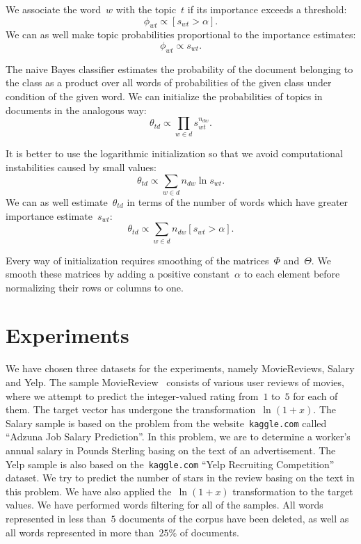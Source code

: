 \documentclass{sig-alternate-2013}
\begin{document}
We associate the word~$w$ with the topic~$t$ if its importance
exceeds a threshold:
\[
    \phi_{wt} \propto [s_{wt} > \alpha].
\]
We can as well make topic probabilities proportional to the importance estimates:
\[
    \phi_{wt} \propto s_{wt}.
\]


The naive Bayes classifier estimates the probability of the document belonging to the class as a product over all words of probabilities of the given class under condition of the given word. We can initialize the probabilities of topics in documents in the analogous way:
\[
    \theta_{td}
    \propto
    \prod_{w \in d}
        s_{wt}^{n_{dw}}.
\]

It is better to use the logarithmic initialization so that we avoid computational instabilities caused by small values:
\begin{equation}
\label{eq:theta_init_prob_log}
    \theta_{td}
    \propto
    \sum_{w \in d}
        n_{dw} \ln s_{wt}.
\end{equation}
We can as well estimate~$\theta_{td}$ in terms of the number of words which
have greater importance estimate~$s_{wt}$:
\begin{equation}
\label{eq:theta_init_threshold}
    \theta_{td} \propto \sum_{w \in d} n_{dw} [s_{wt} > \alpha].
\end{equation}


Every way of initialization requires smoothing of the matrices~$\Phi$ and~$\Theta$.
We smooth these matrices by adding a positive constant~$\alpha$ to each element
before normalizing their rows or columns to one.


\section{Experiments}

We have chosen three datasets for the experiments, namely MovieReviews, Salary and Yelp. The sample MovieReview~\cite{pang05reviews} consists of various user reviews of movies, where we attempt to predict the integer-valued rating from~$1$ to~$5$ for each of them.
The target vector has undergone the transformation~$\ln(1 + x)$. The Salary sample is based on the problem from the website~\texttt{kaggle.com} called ``Adzuna Job Salary Prediction''.
In this problem, we are to determine a worker's annual salary in Pounds Sterling basing on the text of an advertisement. The Yelp sample is also based on the~\texttt{kaggle.com} ``Yelp Recruiting Competition'' dataset. We try to predict the number of stars in the review basing on the text in this problem. We have also applied the~$\ln(1 + x)$ transformation to the target values.
We have performed words filtering for all of the samples. All words represented in less than~$5$ documents of the corpus have been deleted, as well as all words represented in more than~$25\%$ of documents.
\end{document}

